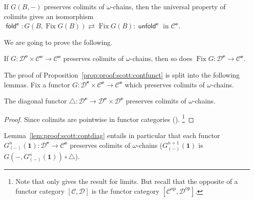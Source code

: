 \documentclass[%
  a4paper,
  UKenglish,
  cleveref,
  autoref,
  thm-restate,
  numberwithinsect,
]{lipics-v2021}
\newcommand\pl{\mathord{-}}	%
\newcommand\one{\mathbf{1}}	%
\newcommand\cat\mathcal
\newcommand\comp{\mathbin\circ}
\newcommand\op{{\mathrm{op}}}
\newcommand\Fix{\mathop{\mathrm{Fix}}}
\newcommand\term[1]{\mathsf{#1}}
\newcommand\fold{\mathop{\term{fold}}}
\newcommand\unfold{\mathop{\term{unfold}}}
\newcommand\ep{{\mathbf{e}}}
\newcommand\modgen{\mathord{\triangle}}	%
\begin{document}
If $G(B,\pl)$ preserves colimits of $\omega$-chains,
then the universal property of colimits gives an isomorphism
\(
  \fold^\ep
  :
  G(B,\Fix G(B))
  \rightleftarrows
  \Fix G(B)
  :
  \unfold^\ep
\)
in $\cat C^\ep$.

We are going to prove the following.

\begin{proposition}
\label{prop:proof:scott:contfunct}
If $G \colon \cat D^\ep \times \cat C^\ep \to \cat C^\ep$
preserves colimits of $\omega$-chains,
then so does $\Fix G \colon \cat D^\ep \to \cat C^\ep$.
\end{proposition}

The proof of Proposition~\ref{prop:proof:scott:contfunct}
is split into the following lemmas.
Fix a functor $G \colon \cat D^\ep \times \cat C^\ep \to \cat C^\ep$
which preserves colimits of $\omega$-chains.

\begin{lemma}
\label{lem:proof:scott:contdiag}
The diagonal functor $\modgen \colon \cat D^\ep \to \cat D^\ep \times \cat D^\ep$
preserves colimits of $\omega$-chains.
\end{lemma}

\begin{proof}
Since colimits are pointwise in functor categories
(\cite[Corollary V.3]{maclane98book}).%
\footnote{Note that \cite[Corollary V.3]{maclane98book} only gives the result for limits.
But recall that the opposite of a functor category $[\cat C,\cat D]$
is the functor category $[\cat C^\op, \cat D^\op]$.}
\end{proof}

Lemma~\ref{lem:proof:scott:contdiag}
entails in particular that each functor
$G^n_{(\pl)}(\one) \colon \cat D^\ep \to \cat C^\ep$
preserves colimits of $\omega$-chains
($G^{n+1}_{(\pl)}(\one)$ is
$G(\pl,G^{n}_{(\pl)}(\one)) \comp \modgen$).
\end{document}
